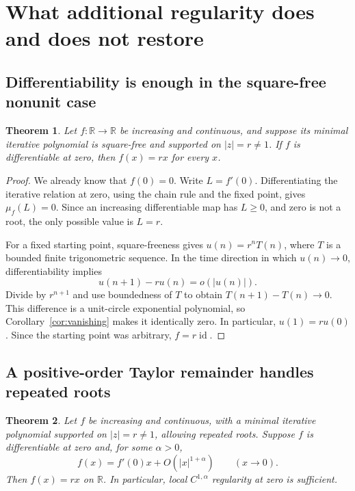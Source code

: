 \documentclass[11pt,letterpaper]{article}
\newtheorem{theorem}{Theorem}[section]
\theoremstyle{definition}
\theoremstyle{remark}
\newcommand{\R}{\mathbb R}
\newcommand{\id}{\operatorname{id}}
\begin{document}
\section{What additional regularity does and does not restore}
\label{sec:regularity}

\subsection{Differentiability is enough in the square-free nonunit case}

\begin{theorem}
\label{thm:C1simple}
Let $f:\R\to\R$ be increasing and continuous, and suppose its minimal
iterative polynomial is square-free and supported on $|z|=r\ne1$.
If $f$ is differentiable at zero, then $f(x)=rx$ for every $x$.
\end{theorem}

\begin{proof}
We already know that $f(0)=0$. Write $L=f'(0)$. Differentiating the
iterative relation at zero, using the chain rule and the fixed point,
gives $\mu_f(L)=0$. Since an increasing differentiable map has
$L\ge0$, and zero is not a root, the only possible value is $L=r$.

For a fixed starting point, square-freeness gives
$u(n)=r^nT(n)$, where $T$ is a bounded finite trigonometric sequence.
In the time direction in which $u(n)\to0$, differentiability implies
\begin{equation}
  u(n+1)-ru(n)=o(|u(n)|).
\end{equation}
Divide by $r^{n+1}$ and use boundedness of $T$ to obtain
$T(n+1)-T(n)\to0$. This difference is a unit-circle exponential
polynomial, so Corollary~\ref{cor:vanishing} makes it identically zero.
In particular, $u(1)=ru(0)$. Since the starting point was arbitrary,
$f= r\id$.
\end{proof}

\subsection{A positive-order Taylor remainder handles repeated roots}

\begin{theorem}
\label{thm:holder}
Let $f$ be increasing and continuous, with a minimal iterative polynomial
supported on $|z|=r\ne1$, allowing repeated roots. Suppose $f$ is
differentiable at zero and, for some $\alpha>0$,
\begin{equation}
 f(x)=f'(0)x+O(|x|^{1+\alpha})\qquad(x\to0).
 \label{eq:holder}
\end{equation}
Then $f(x)=rx$ on $\R$. In particular, local $C^{1,\alpha}$ regularity
at zero is sufficient.
\end{theorem}
\end{document}
